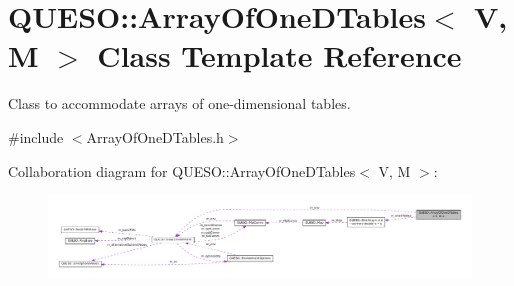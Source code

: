\hypertarget{class_q_u_e_s_o_1_1_array_of_one_d_tables}{\section{Q\-U\-E\-S\-O\-:\-:Array\-Of\-One\-D\-Tables$<$ V, M $>$ Class Template Reference}
\label{class_q_u_e_s_o_1_1_array_of_one_d_tables}
}


Class to accommodate arrays of one-\/dimensional tables.  




{\ttfamily \#include $<$Array\-Of\-One\-D\-Tables.\-h$>$}



Collaboration diagram for Q\-U\-E\-S\-O\-:\-:Array\-Of\-One\-D\-Tables$<$ V, M $>$\-:
\nopagebreak
\begin{figure}[H]
\begin{center}
\leavevmode
\includegraphics[width=350pt]{class_q_u_e_s_o_1_1_array_of_one_d_tables__coll__graph}
\end{center}
\end{figure}

